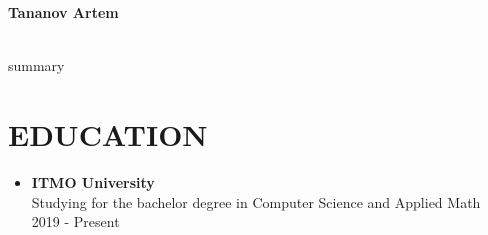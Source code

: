 \documentclass{resume}
\begin{document}
\begin{center}
    \textbf{\Huge Tananov Artem } \\
    \small{
         \\
    }
\end{center}
    
     summary
     
     
\section{EDUCATION}{\small
    \begin{itemize}
        \item \textbf{ITMO University}\\
            {\footnotesize Studying for the bachelor degree in Computer Science and Applied Math}\\
            {\footnotesize 2019 - Present}
    \end{itemize}
}
    
\end{document}
